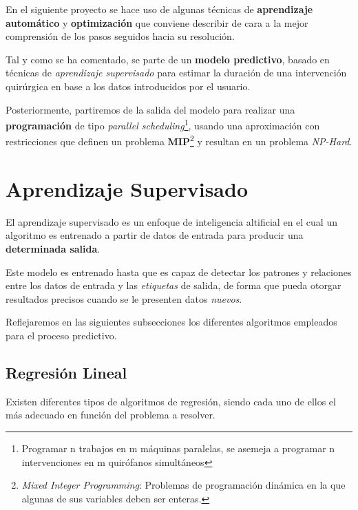 
En el siguiente proyecto se hace uso de algunas técnicas de \textbf{aprendizaje automático} y \textbf{optimización} que conviene describir de cara a la mejor comprensión de los pasos seguidos hacia su resolución.

Tal y como se ha comentado, se parte de un \textbf{modelo predictivo}, basado en técnicas de \textit{aprendizaje supervisado} para estimar la duración de una intervención quirúrgica en base a los datos introducidos por el usuario.

Posteriormente, partiremos de la salida del modelo para realizar una \textbf{programación} de tipo \textit{parallel scheduling}\footnote{Programar n trabajos en m máquinas paralelas\cite{Xing2000ParallelJobs}, se asemeja a programar n intervenciones en m quirófanos simultáneos}, usando una aproximación con restricciones que definen un problema \textbf{MIP}\footnote{\textit{Mixed Integer Programming}: Problemas de programación dinámica en la que algunas de sus variables deben ser enteras.\cite{RichardsMixed-integerControl}} \cite{Lin2020AScheduling} y resultan en un problema \textit{NP-Hard}.



\section{Aprendizaje Supervisado}

El aprendizaje supervisado es un enfoque de inteligencia altificial en el cual un algoritmo es entrenado a partir de datos de entrada para producir una \textbf{determinada salida}. 

Este modelo es entrenado hasta que es capaz de detectar los patrones y relaciones entre los datos de entrada y las \textit{etiquetas} de salida, de forma que pueda otorgar resultados precisos cuando se le presenten datos \textit{nuevos}\cite{PeterssonSupervisedLearning}.

Reflejaremos en las siguientes subsecciones los diferentes algoritmos empleados para el proceso predictivo.

\subsection{Regresión Lineal}

Existen diferentes tipos de algoritmos de regresión, siendo cada uno de ellos el más adecuado en función del problema a resolver.

